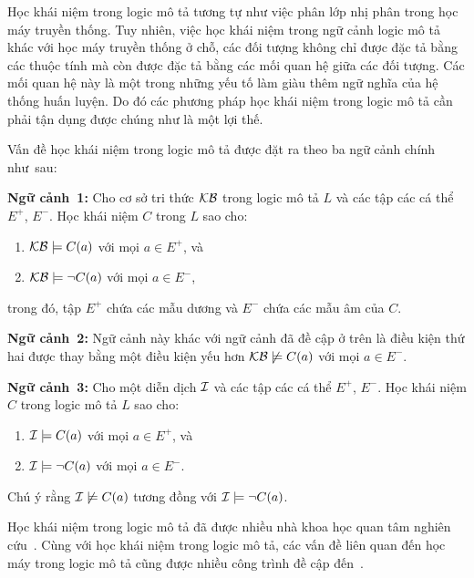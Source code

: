 Học khái niệm trong logic mô tả tương tự như việc phân lớp nhị phân trong học máy truyền thống. Tuy nhiên, việc học khái niệm trong ngữ cảnh logic mô tả khác với học máy truyền thống ở chỗ, các đối tượng không chỉ được đặc tả bằng các thuộc tính mà còn được đặc tả bằng các mối quan hệ giữa các đối tượng. Các mối quan hệ này là một trong những yếu tố làm giàu thêm ngữ nghĩa của hệ thống huấn luyện. Do đó các phương pháp học khái niệm trong logic mô tả cần phải tận dụng được chúng như là một lợi thế.

Vấn đề học khái niệm trong logic mô tả được đặt ra theo ba ngữ cảnh chính như~sau:
%
\begin{description}
	\item\label{setting1}{\bf Ngữ cảnh~1:} Cho cơ sở tri thức $\mathcal{KB}$ trong logic mô tả $L$ và các tập các cá thể $E^+$, $E^-$. Học khái niệm $C$ trong $L$ sao cho:
	\begin{enumerate}
		\item $\mathcal{KB} \models C(a)$ với mọi $a \in E^+$, và
		\item $\mathcal{KB} \models \lnot C(a)$ với mọi $a \in E^-$,
	\end{enumerate}
	trong đó, tập $E^+$ chứa các mẫu dương và $E^-$ chứa các mẫu âm của $C$.
	
	\item\label{setting2}{\bf Ngữ cảnh~2:} Ngữ cảnh này khác với ngữ cảnh đã đề cập ở trên là điều kiện thứ hai được thay bằng một điều kiện yếu hơn $\mathcal{KB} \not\models C(a)$ với mọi $a \in E^-$.
	
	\item\label{setting3}{\bf Ngữ cảnh~3:} Cho một diễn dịch $\mathcal{I}$ và các tập các cá thể $E^+$, $E^-$. Học khái niệm $C$ trong logic mô tả $L$ sao cho:
	\begin{enumerate}
		\item $\mathcal{I} \models C(a)$ với mọi $a \in E^+$, và
		\item $\mathcal{I} \models \lnot C(a)$ với mọi $a \in E^-$.
	\end{enumerate}
	Chú ý rằng $\mathcal{I} \not\models C(a)$ tương đồng với $\mathcal{I} \models \lnot C(a)$.
\end{description}

Học khái niệm trong logic mô tả đã được nhiều nhà khoa học quan tâm nghiên cứu~\cite{Quinlan1990,Cohen1994,Lambrix1998,Badea2000,Iannone2007,Fanizzi2004,Fanizzi2008,Lehmann2007,Fanizzi2010,Lehmann2010,Nguyen2013,Tran2012,Ha2012}. Cùng với học khái niệm trong logic mô tả, các vấn đề liên quan đến học máy trong logic mô tả cũng được nhiều công trình đề cập đến~\cite{Alvarez2000,Kietz2003,Revoredo2010,Konstantopoulos2010,Distel2011}.

